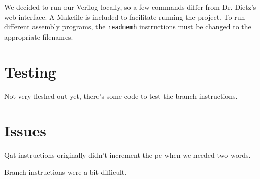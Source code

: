 \documentclass{sig-alternate-05-2015}
\begin{document}
We decided to run our Verilog locally, so a few commands differ from Dr. Dietz's web interface. A Makefile is included to facilitate running the project. To run different assembly programs, the \texttt{readmemh} instructions must be changed to the appropriate filenames.

\vfill\pagebreak

\section{Testing}

Not very fleshed out yet, there's some code to test the branch instructions.

\section{Issues}

Qat instructions originally didn't increment the pc when we needed two words.

Branch instructions were a bit difficult.
\end{document}
